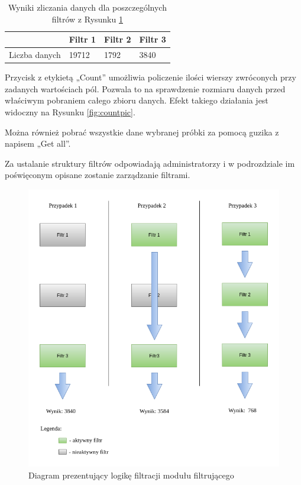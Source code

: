 \documentclass[a4paper,12pt,twoside]{article}
\begin{document}
\begin{center}
\begin{table} [H]
\begin{tabular}{| p{4cm }| p{2.7cm} | p{2.7cm} | p{2.7cm}|}
\hline
& Filtr 1 & Filtr 2 & Filtr 3\\
\hline
Liczba danych & 19712 & 1792 & 3840\\ \hline
\end{tabular}

\caption{Wyniki zliczania danych dla poszczególnych filtrów z Rysunku \ref{fig:filterDiagrampic}}
\label{table:filterDiagramTable}
\end{table}
\end{center}

Przycisk z etykietą „Count” umożliwia policzenie ilości wierszy zwróconych przy zadanych wartościach pól. Pozwala to na sprawdzenie rozmiaru danych przed właściwym pobraniem całego zbioru danych. Efekt takiego działania jest widoczny na Rysunku \ref{fig:countpic}.

Można również pobrać wszystkie dane wybranej próbki za pomocą guzika z napisem „Get all”.

Za ustalanie struktury filtrów odpowiadają administratorzy i w podrozdziale im poświęconym
opisane zostanie zarządzanie filtrami.

\setlength{\footskip}{0pt}
\begin{figure}
\includegraphics[width=1\linewidth]{obrazy/aplikacja/filterDiagram.png}
\caption{Diagram prezentujący logikę filtracji modułu filtrującego}
\label{fig:filterDiagrampic}
\end{figure}
\restoregeometry
\end{document}

